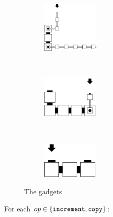 \begin{figure}[H]
    \centering
    \begin{subfigure}[t]{0.3\textwidth}
        \centering
        \includegraphics[width=0.3\textwidth]{return_paths/read_next_3_op-or-seed_msr_msd}
        \caption{\label{fig:read_next_3_oporseed_msr_msd}}
    \end{subfigure}%
    ~
    \begin{subfigure}[t]{0.3\textwidth}
        \centering
        \includegraphics[width=0.3\textwidth]{return_paths/read_next_3_seed}
        \caption{\label{fig:read_next_3_seed}}
    \end{subfigure}%
    ~
    \begin{subfigure}[t]{0.3\textwidth}
        \centering
        \includegraphics[width=0.3\textwidth]{return_paths/read_next_2_seed}
        \caption{\label{fig:read_next_2_seed}}
    \end{subfigure}%
    \caption{\label{fig:readnext} The {\readnext} gadgets}
\end{figure}
For each $op\in \{ {\tt increment}, {\tt copy} \}$:
